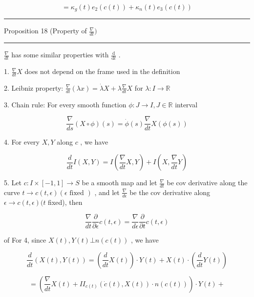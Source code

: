 \documentclass[lang=cn,a4paper,11pt,openany,twoside]{elegantbook}
\newcommand{\HRule}{\begin{center}\rule{0.9\linewidth}{0.2mm}\end{center}}
\begin{document}
\[
= {\kappa }_{g}\left( t\right) {e}_{2}\left( {c\left( t\right) }\right)  + {\kappa }_{n}\left( t\right) {e}_{3}\left( {c\left( t\right) }\right)
\]

\HRule

Proposition 18 (Property of \(\frac{\nabla }{dt})\)

\HRule

\(\frac{\nabla }{dt}\) has some similar properties with \(\frac{\mathrm{d}}{\mathrm{d}t}\) .

1. \(\frac{\nabla }{dt}X\) does not depend on the frame used in the definition

2. Leibniz property: \(\frac{\nabla }{dt}\left( {\lambda x}\right)  = \dot{\lambda }X + \lambda \frac{\nabla }{dt}X\) for \(\lambda  : I \rightarrow  \mathbb{R}\)

3. Chain rule: For every smooth function \(\phi  : J \rightarrow  I,J \in  \mathbb{R}\) interval

\[
\frac{\nabla }{ds}\left( {X \circ  \phi }\right) \left( s\right)  = \dot{\phi }\left( s\right) \frac{\nabla }{dt}X\left( {\phi \left( s\right) }\right)
\]

4. For every \(X,Y\) along \(c\) , we have

\[
\frac{d}{dt}I\left( {X,Y}\right)  = I\left( {\frac{\nabla }{dt}X,Y}\right)  + I\left( {X,\frac{\nabla }{dt}Y}\right)
\]

5. Let \(c : I \times  \left\lbrack  {-1,1}\right\rbrack   \rightarrow  S\) be a smooth map and let \(\frac{\nabla }{dt}\) be cov derivative along the curve \(t \rightarrow  c\left( {t,\epsilon }\right) \left( {\epsilon \text{ fixed }}\right)\) , and let \(\frac{\nabla }{d\epsilon }\) be the cov derivative along \(\epsilon  \rightarrow  c\left( {t,\epsilon }\right) (t\) fixed), then

\[
\frac{\nabla }{dt}\frac{\partial }{\partial \epsilon }c\left( {t,\epsilon }\right)  = \frac{\nabla }{d\epsilon }\frac{\partial }{\partial t}c\left( {t,\epsilon }\right)
\]

of For 4, since \(X\left( t\right) ,Y\left( t\right)  \bot  n\left( {c\left( t\right) }\right)\) , we have

\[
\frac{d}{dt}\left( {X\left( t\right) ,Y\left( t\right) }\right)  = \left( {\frac{d}{dt}X\left( t\right) }\right)  \cdot  Y\left( t\right)  + X\left( t\right)  \cdot  \left( {\frac{d}{dt}Y\left( t\right) }\right)
\]

\[
= \left( {\frac{\nabla }{dt}X\left( t\right)  + I{I}_{c\left( t\right) }\left( {\dot{c}\left( t\right) ,X\left( t\right) }\right)  \cdot  n\left( {c\left( t\right) }\right) }\right)  \cdot  Y\left( t\right)  +
\]
\end{document}
